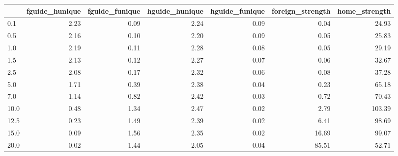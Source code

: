 \begin{tabular}{lrrrrrr}
\toprule
 & fguide_hunique & fguide_funique & hguide_hunique & hguide_funique & foreign_strength & home_strength \\
\midrule
0.1 & 2.23 & 0.09 & 2.24 & 0.09 & 0.04 & 24.93 \\
0.5 & 2.16 & 0.10 & 2.20 & 0.09 & 0.05 & 25.83 \\
1.0 & 2.19 & 0.11 & 2.28 & 0.08 & 0.05 & 29.19 \\
1.5 & 2.13 & 0.12 & 2.27 & 0.07 & 0.06 & 32.67 \\
2.5 & 2.08 & 0.17 & 2.32 & 0.06 & 0.08 & 37.28 \\
5.0 & 1.71 & 0.39 & 2.38 & 0.04 & 0.23 & 65.18 \\
7.0 & 1.14 & 0.82 & 2.42 & 0.03 & 0.72 & 70.43 \\
10.0 & 0.48 & 1.34 & 2.47 & 0.02 & 2.79 & 103.39 \\
12.5 & 0.23 & 1.49 & 2.39 & 0.02 & 6.41 & 98.69 \\
15.0 & 0.09 & 1.56 & 2.35 & 0.02 & 16.69 & 99.07 \\
20.0 & 0.02 & 1.44 & 2.05 & 0.04 & 85.51 & 52.71 \\
\bottomrule
\end{tabular}

